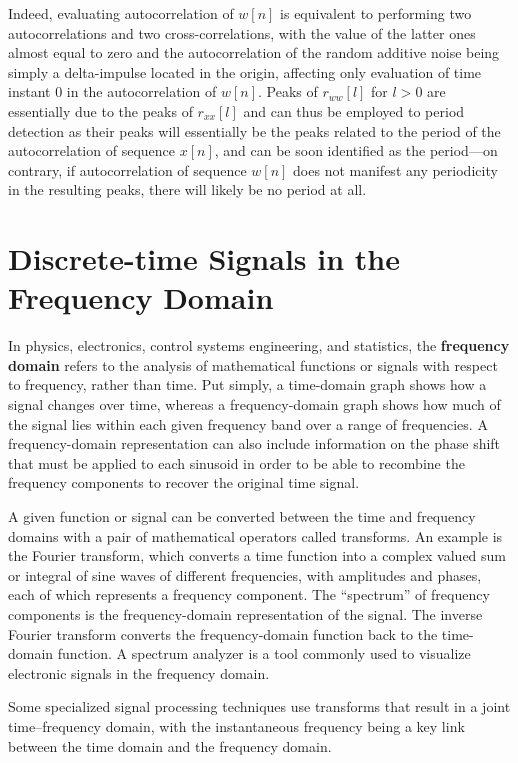 \documentclass[\documentfontsize, twocolumn]{\classname}
\begin{document}
Indeed, evaluating autocorrelation of $w[n]$ is equivalent to performing two autocorrelations and two cross-correlations, with the value of the latter ones almost equal to zero and the autocorrelation of the random additive noise being simply a delta-impulse located in the origin, affecting only evaluation of time instant $0$ in the autocorrelation of $w[n]$. Peaks of $r_{ww}[l]$ for $l > 0$ are essentially due to the peaks of $r_{xx}[l]$ and can thus be employed to period detection as their peaks will essentially be the peaks related to the period of the autocorrelation of sequence $x[n]$, and can be soon identified as the period---on contrary, if autocorrelation of sequence $w[n]$ does not manifest any periodicity in the resulting peaks, there will likely be no period at all.


\chapter{Discrete-time Signals in the Frequency Domain}
In physics, electronics, control systems engineering, and statistics, the \textbf{frequency domain} refers to the analysis of mathematical functions or signals with respect to frequency, rather than time. Put simply, a time-domain graph shows how a signal changes over time, whereas a frequency-domain graph shows how much of the signal lies within each given frequency band over a range of frequencies. A frequency-domain representation can also include information on the phase shift that must be applied to each sinusoid in order to be able to recombine the frequency components to recover the original time signal.

A given function or signal can be converted between the time and frequency domains with a pair of mathematical operators called transforms. An example is the Fourier transform, which converts a time function into a complex valued sum or integral of sine waves of different frequencies, with amplitudes and phases, each of which represents a frequency component. The ``spectrum'' of frequency components is the frequency-domain representation of the signal. The inverse Fourier transform converts the frequency-domain function back to the time-domain function. A spectrum analyzer is a tool commonly used to visualize electronic signals in the frequency domain.

Some specialized signal processing techniques use transforms that result in a joint time–frequency domain, with the instantaneous frequency being a key link between the time domain and the frequency domain.
\end{document}
